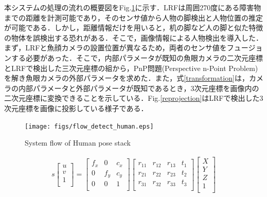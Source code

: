\documentclass[12pt]{sonota/aislab}
\begin{document}
本システムの処理の流れの概要図をFig.\ref{flow}に示す．LRFは周囲270度にある障害物までの距離を計測可能であり，そのセンサ値から人物の脚検出と人物位置の推定が可能である．しかし，距離情報だけを用いると，机の脚など人の脚と似た特徴の物体を誤検出する恐れがある．そこで，画像情報による人物検出を導入した．まず，LRFと魚顔カメラの設置位置が異なるため，両者のセンサ値をフュージョンする必要があった．そこで，内部パラメータが既知の魚眼カメラの二次元座標とLRFで検出した三次元座標の組から，PnP問題(Perspective n-Point Problem)を解き魚眼カメラの外部パラメータを求めた．また，式\ref{transformation}は，カメラの内部パラメータと外部パラメータが既知であるとき，3次元座標を画像内の二次元座標に変換できることを示している．Fig.\ref{reprojection}はLRFで検出した3次元座標を画像に投影している様子である．

\begin{figure}[t]
\begin{center}
\texttt{[image: figs/flow\_detect\_human.eps]}
\caption{System flow of Human pose stack}
\label{flow}
\end{center}
\end{figure}

\begin{eqnarray}
s\left[
\begin{array}{ccc}
u \\
v \\
1 \\
\end{array}
\right]
=
\left[
\begin{array}{ccc}
f_{x} & 0 & c_{x} \\
0 & f_{y} & c_{y} \\
0 & 0 & 1 \\
\end{array}
\right]
\left[
\begin{array}{cccc}
r_{11} & r_{12} & r_{13} & t_{1} \\
r_{21} & r_{22} & r_{23} & t_{2} \\
r_{31} & r_{32} & r_{33} & t_{3} \\
\end{array}
\right]
\left[
\begin{array}{c}
X \\
Y \\
Z \\
1 \\
\end{array}
\right] \label{transformation}
\end{eqnarray}

\end{document}
